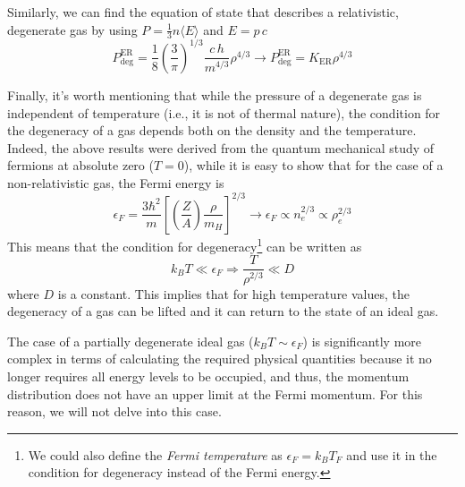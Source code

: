 \documentclass[main.tex]{subfiles}
\begin{document}
Similarly, we can find the equation of state that describes a relativistic, degenerate gas by using $P = \frac{1}{3}n \langle E \rangle$ and $E = p\,c$
\begin{equation}
    \label{apx:eq:degenerate_eos_er}
    \boxed{P_{\text{deg}}^{\text{ER}} = \frac{1}{8} \left( \frac{3}{\pi} \right)^{1/3} \frac{c\,h}{m^{4/3}} \rho^{4/3} \longrightarrow P_{\text{deg}}^{\text{ER}} = K_{\text{ER}} \rho^{4/3}}
\end{equation}

Finally, it's worth mentioning that while the pressure of a degenerate gas is independent of temperature (i.e., it is not of thermal nature), the condition for the degeneracy of a gas depends both on the density and the temperature. Indeed, the above results were derived from the quantum mechanical study of fermions at absolute zero ($T=0$), while it is easy to show that for the case of a non-relativistic gas, the Fermi energy is
$$\epsilon_F = \frac{3\hbar^2}{m} \left[\left( \frac{Z}{A} \right) \frac{\rho}{m_H} \right]^{2/3} \longrightarrow \epsilon_F \propto n_e^{2/3} \propto \rho_e^{2/3}$$
This means that the condition for degeneracy\footnote{We could also define the \textit{Fermi temperature} as $\epsilon_F = k_B T_F$ and use it in the condition for degeneracy instead of the Fermi energy.} can be written as
$$k_B T \ll \epsilon_F \Rightarrow \frac{T}{\rho^{2/3}} \ll D$$
where $D$ is a constant. This implies that for high temperature values, the degeneracy of a gas can be lifted and it can return to the state of an ideal gas.

The case of a partially degenerate ideal gas ($k_B T \sim \epsilon_F$) is significantly more complex in terms of calculating the required physical quantities because it no longer requires all energy levels to be occupied, and thus, the momentum distribution does not have an upper limit at the Fermi momentum. For this reason, we will not delve into this case.
\end{document}
